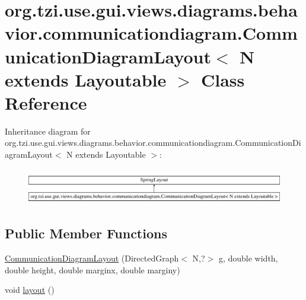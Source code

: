 \hypertarget{classorg_1_1tzi_1_1use_1_1gui_1_1views_1_1diagrams_1_1behavior_1_1communicationdiagram_1_1_commuf54f98cd7b651f04d6ed507c9c374b00}{\section{org.\-tzi.\-use.\-gui.\-views.\-diagrams.\-behavior.\-communicationdiagram.\-Communication\-Diagram\-Layout$<$ N extends Layoutable $>$ Class Reference}
\label{classorg_1_1tzi_1_1use_1_1gui_1_1views_1_1diagrams_1_1behavior_1_1communicationdiagram_1_1_commuf54f98cd7b651f04d6ed507c9c374b00}
}
Inheritance diagram for org.\-tzi.\-use.\-gui.\-views.\-diagrams.\-behavior.\-communicationdiagram.\-Communication\-Diagram\-Layout$<$ N extends Layoutable $>$\-:\begin{figure}[H]
\begin{center}
\leavevmode
\includegraphics[height=1.602289cm]{classorg_1_1tzi_1_1use_1_1gui_1_1views_1_1diagrams_1_1behavior_1_1communicationdiagram_1_1_commuf54f98cd7b651f04d6ed507c9c374b00}
\end{center}
\end{figure}
\subsection*{Public Member Functions}
\begin{DoxyCompactItemize}
\item 
\hyperlink{classorg_1_1tzi_1_1use_1_1gui_1_1views_1_1diagrams_1_1behavior_1_1communicationdiagram_1_1_commuf54f98cd7b651f04d6ed507c9c374b00_a4d06ddcbaa7e680a28848ac760529c44}{Communication\-Diagram\-Layout} (Directed\-Graph$<$ N,?$>$ g, double width, double height, double marginx, double marginy)
\item 
void \hyperlink{classorg_1_1tzi_1_1use_1_1gui_1_1views_1_1diagrams_1_1behavior_1_1communicationdiagram_1_1_commuf54f98cd7b651f04d6ed507c9c374b00_a96e4fca5fc7da75e3c8be52b055037b1}{layout} ()
\end{DoxyCompactItemize}


